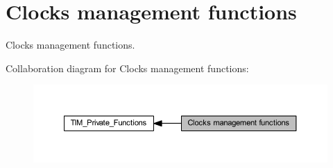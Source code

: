 \hypertarget{group___t_i_m___group6}{}\section{Clocks management functions}
\label{group___t_i_m___group6}


Clocks management functions.  


Collaboration diagram for Clocks management functions\+:\nopagebreak
\begin{figure}[H]
\begin{center}
\leavevmode
\includegraphics[width=350pt]{group___t_i_m___group6}
\end{center}
\end{figure}

